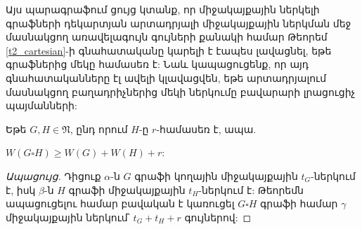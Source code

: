 Այս պարագրաֆում ցույց կտանք, որ միջակայքային ներկելի գրաֆների դեկարտյան արտադրյալի միջակայքային ներկման մեջ մասնակցող առավելագույն գույների քանակի համար Թեորեմ \ref{t2_cartesian}-ի գնահատականը կարելի է էապես լավացնել, եթե գրաֆներից մեկը համասեռ է: Նաև կապացուցենք, որ այդ գնահատականները էլ ավելի կլավացվեն, եթե արտադրյալում մասնակցող բաղադրիչներից մեկի ներկումը բավարարի լրացուցիչ պայմանների:


\begin{theorem}
\label{t2_regular_product} Եթե $G,H\in \mathfrak{N}$, ընդ որում $H$-ը $r$-համասեռ է, ապա.
\begin{center}
$W(G\square H)\geq W(G)+W(H)+r$:
\end{center}
\end{theorem}
\begin{proof}[Ապացույց]
Դիցուք $\alpha$-ն $G$ գրաֆի կողային միջակայքային $t_G$-ներկում է, իսկ $\beta$-ն $H$ գրաֆի միջակայքային $t_H$-ներկում է: Թեորեմն ապացուցելու համար բավական է կառուցել $G\square H$ գրաֆի համար $\gamma$ միջակայքային ներկում՝ $t_G+t_H+r$ գույներով: 


\end{proof}
